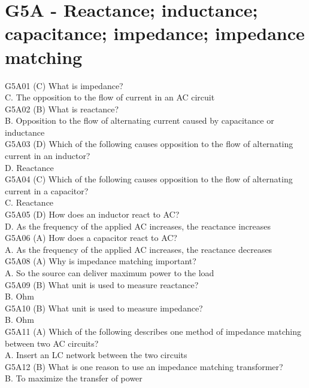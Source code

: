 \documentclass[12pt,letterpaper]{report}
\begin{document}
\section{G5A - Reactance; inductance; capacitance; impedance; impedance matching}

G5A01 (C) What is impedance?\\
C. The opposition to the flow of current in an AC circuit\\

G5A02 (B) What is reactance?\\
B. Opposition to the flow of alternating current caused by capacitance or inductance\\

G5A03 (D) Which of the following causes opposition to the flow of alternating current in an inductor?\\
D. Reactance\\

G5A04 (C) Which of the following causes opposition to the flow of alternating current in a capacitor?\\
C. Reactance\\

G5A05 (D) How does an inductor react to AC?\\
D. As the frequency of the applied AC increases, the reactance increases\\

G5A06 (A) How does a capacitor react to AC?\\
A. As the frequency of the applied AC increases, the reactance decreases\\

G5A08 (A) Why is impedance matching important?\\
A. So the source can deliver maximum power to the load\\

G5A09 (B) What unit is used to measure reactance?\\
B. Ohm\\

G5A10 (B) What unit is used to measure impedance?\\
B. Ohm\\

G5A11 (A) Which of the following describes one method of impedance matching between two AC circuits?\\
A. Insert an LC network between the two circuits\\

G5A12 (B) What is one reason to use an impedance matching transformer?\\
B. To maximize the transfer of power\\
\end{document}
